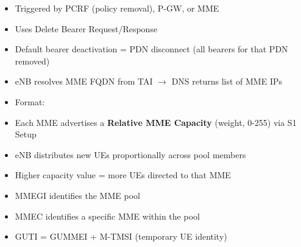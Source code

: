 
\begin{itemize}
\tightlist
\item
  Triggered by PCRF (policy removal), P-GW, or MME
\item
  Uses Delete Bearer Request/\allowbreak{}Response
\item
  Default bearer deactivation = PDN disconnect (all bearers for that PDN removed)
\end{itemize}



\CNchained{}

\begin{itemize}
\tightlist
\item
  eNB resolves MME FQDN from TAI \ensuremath{\to} DNS returns list of MME IPs
\item
  Format: \allowbreak{}\allowbreak{}\allowbreak{}\allowbreak{}\allowbreak{}\allowbreak{}\allowbreak{}
\end{itemize}


\begin{itemize}
\tightlist
\item
  Each MME advertises a \textbf{Relative MME Capacity} (weight, 0-255) via S1 Setup
\item
  eNB distributes new UEs proportionally across pool members
\item
  Higher capacity value = more UEs directed to that MME
\end{itemize}



\begin{itemize}
\tightlist
\item
  MMEGI identifies the MME pool
\item
  MMEC identifies a specific MME within the pool
\item
  GUTI = GUMMEI + M-TMSI (temporary UE identity)
\end{itemize}

